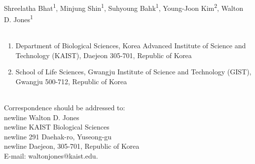 Shreelatha Bhat\textsuperscript{1}, Minjung Shin\textsuperscript{1}, Suhyoung Bahk\textsuperscript{1}, Young-Joon Kim\textsuperscript{2}, Walton D. Jones\textsuperscript{1}
\\
\\
\begin{enumerate}
\item Department of Biological Sciences, Korea Advanced Institute of Science and Technology (KAIST), Daejeon 305-701, Republic of Korea
\item School of Life Sciences, Gwangju Institute of Science and Technology (GIST), Gwangju 500-712, Republic of Korea
\end{enumerate}
\\
Correspondence should be addressed to:
\\newline Walton D. Jones
\\newline KAIST Biological Sciences
\\newline 291 Daehak-ro, Yuseong-gu
\\newline Daejeon, 305-701, Republic of Korea
\\E-mail: waltonjones@kaist.edu.